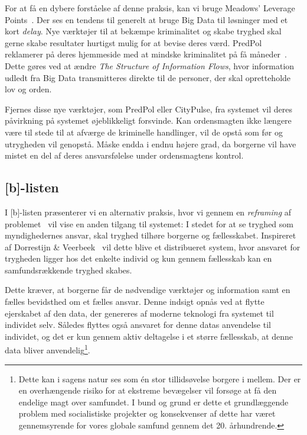 For at få en dybere forståelse af denne praksis, kan vi bruge Meadows' Leverage Points~\cite[]{LeveragePoints}. Der ses en tendens til generelt at bruge Big Data til løsninger med et kort \textit{delay}. Nye værktøjer til at bekæmpe kriminalitet og skabe tryghed skal gerne skabe resultater hurtigst mulig for at bevise deres værd. PredPol reklamerer på deres hjemmeside med at mindske kriminalitet på få måneder~\cite[]{PredPol}. Dette gøres ved at ændre \textit{The Structure of Information Flows}, hvor information udledt fra Big Data transmitteres direkte til de personer, der skal opretteholde lov og orden.

Fjernes disse nye værktøjer, som PredPol eller CityPulse, fra systemet vil deres påvirkning på systemet øjeblikkeligt forsvinde. Kan ordensmagten ikke længere være til stede til at afværge de kriminelle handlinger, vil de opstå som før og utrygheden vil genopstå. Måske endda i endnu højere grad, da borgerne vil have mistet en del af deres ansvarsfølelse under ordensmagtens kontrol. 


\subsection*{[b]-listen}
I [b]-listen præsenterer vi en alternativ praksis, hvor vi gennem en \textit{reframing} af problemet~\cite[]{FrameInnovation} vil vise en anden tilgang til systemet: I stedet for at se tryghed som myndighedernes ansvar, skal tryghed tilhøre borgerne og fællesskabet. Inspireret af Dorrestijn \& Veerbeek~\cite[]{dorrestijn2013technology} vil dette blive et distribueret system, hvor ansvaret for trygheden ligger hos det enkelte individ og kun gennem fællesskab kan en samfundsrækkende tryghed skabes.

Dette kræver, at borgerne får de nødvendige værktøjer og information samt en fælles bevidsthed om et fælles ansvar. Denne indsigt opnås ved at flytte ejerskabet af den data, der genereres af moderne teknologi fra systemet til individet selv. Således flyttes også ansvaret for denne datas anvendelse til individet, og det er kun gennem aktiv deltagelse i et større fællesskab, at denne data bliver anvendelig\footnote{Dette kan i sagens natur ses som én stor tillidsøvelse borgere i mellem. Der er en overhængende risiko for at ekstreme bevægelser vil forsøge at få den endelige magt over samfundet. I bund og grund er dette et grundlæggende problem med socialistiske projekter og konsekvenser af dette har været gennemsyrende for vores globale samfund gennem det 20. århundrende.}.

